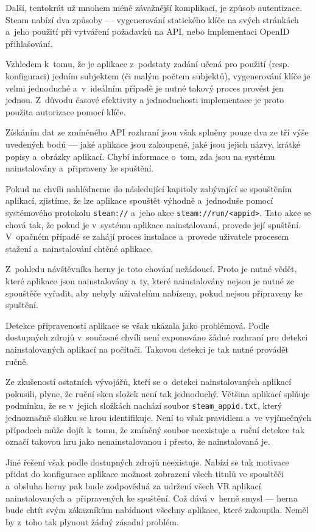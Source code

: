 Další, tentokrát už mnohem méně závažnější komplikací, je způsob
autentizace. Steam nabízí dva způsoby
--- vygenerování statického klíče na svých stránkách a~jeho použití
při vytváření požadavků na API, nebo implementaci OpenID přihlašování.

Vzhledem k~tomu, že je aplikace z~podstaty zadání učená pro použití
(resp. konfiguraci) jedním subjektem (či malým počtem subjektů),
vygenerování klíče je velmi jednoduché a~v~ideálním případě je nutné
takový proces provést jen jednou. Z~důvodu časové efektivity a 
jednoduchosti implementace je proto použita autorizace pomocí klíče.

Získáním dat ze zmíněného API rozhraní jsou však splněny pouze dva
ze tří výše uvedených bodů --- jaké aplikace jsou zakoupené, jaké jsou
jejich názvy, krátké popisy a~obrázky aplikací. Chybí informace o~tom,
zda jsou na systému nainstalovány a~připraveny ke spuštění.

Pokud na chvíli nahlédneme do následující kapitoly zabývající se
spouštěním aplikací, zjistíme, že lze aplikace spouštět výhodně a~jednoduše pomocí systémového protokolu \texttt{steam://} a~jeho akce
\texttt{steam://run/<appid>}. Tato akce se chová
tak, že pokud je v~systému aplikace nainstalovaná, provede její
spuštění. V~opačném případě se zahájí proces instalace a~provede
uživatele procesem stažení a~nainstalování chtěné aplikace. 

Z~pohledu návštěvníka herny je toto chování nežádoucí. Proto je nutné vědět, které aplikace jsou nainstalovány a~ty, které nainstalovány
nejsou je nutné ze spouštěče vyřadit, aby nebyly uživatelům nabízeny,
pokud nejsou připraveny ke spuštění.

Detekce připravenosti aplikace se však ukázala jako
problémová. Podle dostupných zdrojů v~současné chvíli není exponováno
žádné rozhraní pro detekci nainstalovaných aplikací na počítači. 
Takovou detekci je tak nutné provádět ručně. 

Ze zkušeností ostatních vývojářů, kteří se o~detekci nainstalovaných aplikací pokusili,
plyne, že ruční sken složek není tak jednoduchý. \autocite{hardgamedetection} Většina aplikací splňuje
podmínku, že se v~jejich složkách nachází soubor
\texttt{steam\_appid.txt}, který jednoznačně složku se hrou
identifikuje. Není to však pravidlem a~ve vyjímečných případech může
dojít k~tomu, že zmíněný soubor neexistuje a~ruční detekce tak 
označí takovou hru jako nenainstalovanou i přesto, že nainstalovaná je.

Jiné řešení však podle dostupných zdrojů neexistuje. Nabízí se tak
motivace přidat do konfigurace aplikace možnost zobrazení všech titulů
ve spouštěči a~obsluha herny pak bude zodpovědná za udržení všech VR aplikací 
nainstalovaných a~připravených ke spuštění. Což dává v~herně smysl ---
herna bude chtít svým zákazníkům nabídnout všechny aplikace, které
zakoupila. Neměl by z~toho tak plynout žádný zásadní problém.

